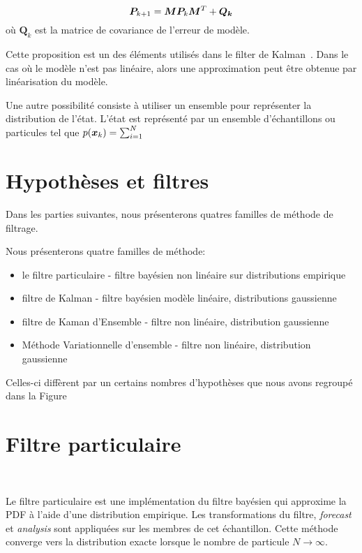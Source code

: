 \begin{equation*}
    \bm{P}_{k+1} = \bm{M} \bm{P}_{k} \bm{M}^T + \bm{Q_k}
\end{equation*}où $\bm Q_k$ est la matrice de covariance de l'erreur de modèle.

Cette proposition est un des éléments utilisés dans le filter de Kalman~\cite{kalman_filter}. Dans le cas où le modèle n'est pas linéaire, alors une approximation peut être obtenue par linéarisation du modèle.

Une autre possibilité consiste à utiliser un ensemble pour représenter la distribution de l'état. L'état est représenté par un ensemble d'échantillons ou particules tel que $p(\bm{x}_k)  = \sum_{i=1}^{N}$


\section{Hypothèses et filtres}

Dans les parties suivantes, nous présenterons quatres familles de méthode de filtrage.

Nous présenterons quatre familles de méthode:
\begin{itemize}
    \item le filtre particulaire - filtre bayésien non linéaire sur distributions empirique
    \item filtre de Kalman - filtre bayésien modèle linéaire, distributions gaussienne
    \item filtre de Kaman d'Ensemble - filtre non linéaire, distribution gaussienne
    \item Méthode Variationnelle d'ensemble - filtre non linéaire, distribution gaussienne

\end{itemize}

Celles-ci diffèrent par un certains nombres d'hypothèses que nous avons regroupé dans la Figure


\section{Filtre particulaire}~\label{filtre_particulaire}

Le filtre particulaire est une implémentation du filtre bayésien qui approxime la PDF à l'aide d'une distribution empirique. Les transformations du filtre, \textit{forecast} et \textit{analysis} sont appliquées sur les membres de cet échantillon.
Cette méthode converge vers la distribution exacte lorsque le nombre de particule $N \to \infty$.

